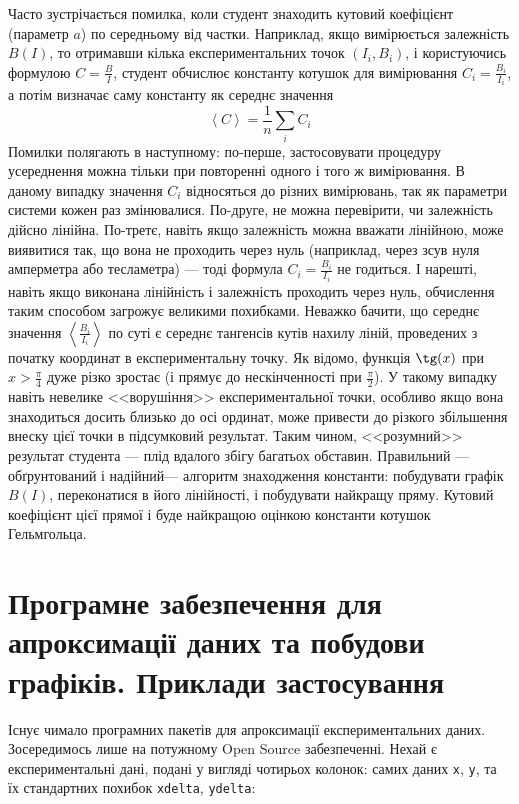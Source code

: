 \documentclass{LabBook}
\begin{document}
  \begin{Warning}
    Часто зустрічається помилка, коли студент знаходить кутовий коефіцієнт (параметр $a$) по середньому від частки. Наприклад, якщо вимірюється залежність  $B(I)$, то отримавши кілька експериментальних точок $(I_i, B_i)$, і користуючись формулою $C = \frac{B}{I}$, студент обчислює константу котушок для вимірювання $C_i = \frac{B_i}{I_i}$, а потім визначає саму константу як середнє значення
    \[
      \left\langle C \right\rangle = \frac1n \sum\limits_i C_i
    \]
    Помилки полягають в наступному: по-перше, застосовувати процедуру усереднення можна тільки при повторенні одного і того ж вимірювання. В даному випадку значення $C_i$ відносяться до різних вимірювань, так як параметри системи кожен раз змінювалися. По-друге, не можна перевірити, чи залежність дійсно лінійна. По-третє, навіть якщо залежність можна вважати лінійною, може виявитися так, що вона не проходить через нуль (наприклад, через зсув нуля амперметра або тесламетра) --- тоді формула $C_i = \frac{B_i}{I_i}$ не годиться. І нарешті, навіть якщо виконана лінійність і залежність проходить через нуль, обчислення таким способом загрожує великими похибками. Неважко бачити, що середнє значення $\left\langle \frac{B_i}{I_i} \right\rangle$ по суті є середнє тангенсів кутів нахилу ліній, проведених з початку координат в експериментальну точку. Як відомо, функція $\tg(x)$ при $x > \frac{\pi}{4}$ дуже різко зростає (і прямує до нескінченності при $\frac{\pi}{2}$). У такому випадку навіть невелике <<ворушіння>> експериментальної точки, особливо якщо вона знаходиться досить близько до осі ординат, може привести до різкого збільшення внеску цієї точки в підсумковий результат. Таким чином, <<розумний>> результат студента --- плід вдалого збігу багатьох обставин. Правильний --- обґрунтований і надійний--- алгоритм знаходження константи: побудувати графік $B(I)$, переконатися в його лінійності, і побудувати найкращу пряму. Кутовий коефіцієнт цієї прямої і буде найкращою оцінкою константи котушок Гельмгольца.
  \end{Warning}


  \clearpage
\section{Програмне забезпечення для апроксимації даних та побудови графіків. Приклади застосування}


  Існує чимало програмних пакетів для апроксимації експериментальних даних. Зосередимось лише на потужному Open Source забезпеченні.
  Нехай є експериментальні дані, подані у вигляді чотирьох колонок: самих даних \texttt{x}, \texttt{y}, та їх стандартних похибок \texttt{xdelta}, \texttt{ydelta}:
\end{document}
